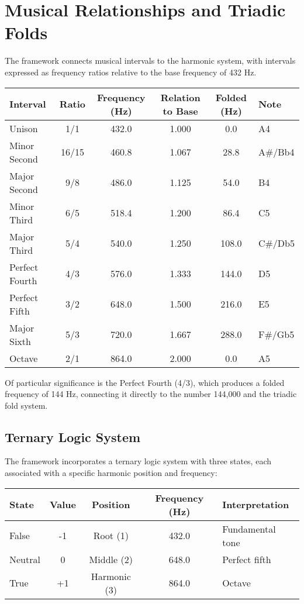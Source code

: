 \section{Musical Relationships and Triadic Folds}

The framework connects musical intervals to the harmonic system, with intervals expressed as frequency ratios relative to the base frequency of 432 Hz.

\begin{longtable}{|l|c|c|c|c|l|}
\hline
\textbf{Interval} & \textbf{Ratio} & \textbf{Frequency (Hz)} & \textbf{Relation to Base} & \textbf{Folded (Hz)} & \textbf{Note} \\
\hline
Unison & 1/1 & 432.0 & 1.000 & 0.0 & A4 \\
\hline
Minor Second & 16/15 & 460.8 & 1.067 & 28.8 & A\#/Bb4 \\
\hline
Major Second & 9/8 & 486.0 & 1.125 & 54.0 & B4 \\
\hline
Minor Third & 6/5 & 518.4 & 1.200 & 86.4 & C5 \\
\hline
Major Third & 5/4 & 540.0 & 1.250 & 108.0 & C\#/Db5 \\
\hline
Perfect Fourth & 4/3 & 576.0 & 1.333 & 144.0 & D5 \\
\hline
Perfect Fifth & 3/2 & 648.0 & 1.500 & 216.0 & E5 \\
\hline
Major Sixth & 5/3 & 720.0 & 1.667 & 288.0 & F\#/Gb5 \\
\hline
Octave & 2/1 & 864.0 & 2.000 & 0.0 & A5 \\
\hline
\end{longtable}

Of particular significance is the Perfect Fourth (4/3), which produces a folded frequency of 144 Hz, connecting it directly to the number 144,000 and the triadic fold system.

\subsection{Ternary Logic System}

The framework incorporates a ternary logic system with three states, each associated with a specific harmonic position and frequency:

\begin{longtable}{|l|c|c|c|l|}
\hline
\textbf{State} & \textbf{Value} & \textbf{Position} & \textbf{Frequency (Hz)} & \textbf{Interpretation} \\
\hline
False & -1 & Root (1) & 432.0 & Fundamental tone \\
\hline
Neutral & 0 & Middle (2) & 648.0 & Perfect fifth \\
\hline
True & +1 & Harmonic (3) & 864.0 & Octave \\
\hline
\end{longtable}

